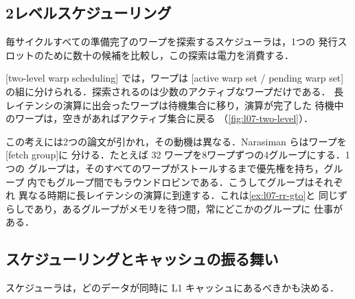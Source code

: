 \documentclass[../main.tex]{subfiles}
\begin{document}
\subsection{2レベルスケジューリング}

毎サイクルすべての準備完了のワープを探索するスケジューラは，1つの
発行スロットのために数十の候補を比較し，この探索は電力を消費する．

\begin{marginfigure}
  
  \caption{2レベルスケジューリング：スケジューラはアクティブ集合だけを
    探索する．}
  \label{fig:l07-two-level}
\end{marginfigure}

\begin{definition}[2レベルワープスケジューリング]
  \label{def:l07-two-level}
  [two-level warp scheduling]
  では，ワープは
  [active warp set / pending warp set]
  の組に分けられる．探索されるのは少数のアクティブなワープだけである．
  長レイテンシの演算に出会ったワープは待機集合に移り，演算が完了した
  待機中のワープは，空きがあればアクティブ集合に戻る
  （\cref{fig:l07-two-level}）．
\end{definition}

この考えには2つの論文が引かれ，その動機は異なる．Narasiman
らはワープを[fetch group]に
分ける．たとえば 32 ワープを8ワープずつの4グループにする．1つの
グループは，そのすべてのワープがストールするまで優先権を持ち，グループ
内でもグループ間でもラウンドロビンである．こうしてグループはそれぞれ
異なる時期に長レイテンシの演算に到達する．これは\cref{ex:l07-rr-gto}と
同じずらしであり，あるグループがメモリを待つ間，常にどこかのグループに
仕事がある．

\subsection{スケジューリングとキャッシュの振る舞い}

スケジューラは，どのデータが同時に L1 キャッシュにあるべきかも決める．
\end{document}
